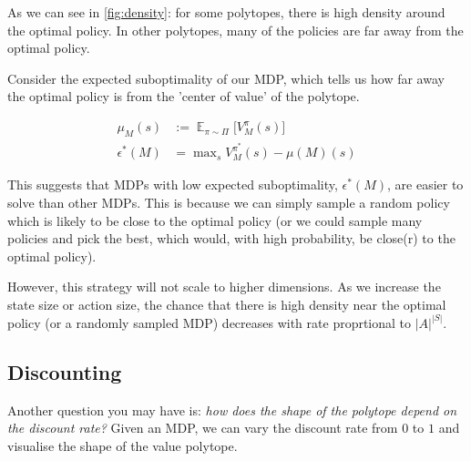 As we can see in \ref{fig:density}: for some polytopes, there is high density around the optimal policy.
In other polytopes, many of the policies are far away from the optimal policy.

Consider the expected suboptimality of our MDP, which tells us how far away the
optimal policy is from the 'center of value' of the polytope.

\begin{align*}
\mu_M(s) &:= \mathop{\mathbb E}_{\pi\sim\Pi}\Big[V_M^{\pi}(s) \Big]\\
\epsilon^{* }(M) &= \mathop{\text{max}}_s V_M^{\pi^{* }}(s) - \mu(M)(s)
\end{align*}

This suggests that MDPs with low expected suboptimality, $\epsilon^{* }(M)$, are easier to solve than other MDPs.
This is because we can simply sample a random policy which is likely to be close to the optimal policy
(or we could sample many policies and pick the best, which would, with high probability, be close(r) to the optimal policy).

However, this strategy will not scale to higher dimensions.
As we increase the state size or action size, the chance that there is high
density near the optimal policy (or a randomly sampled MDP) decreases with rate proprtional to $|A|^{|S|}$.


\subsection{Discounting} \label{discount-polytope}

Another question you may have is: \textit{how does the shape of the polytope depend on the discount rate?}
Given an MDP, we can vary the discount rate from \(0\) to \(1\) and visualise
the shape of the value polytope.

